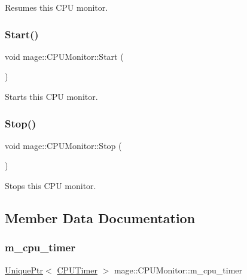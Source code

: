 Resumes this C\+PU monitor. \hypertarget{classmage_1_1_c_p_u_monitor_a3f88acbb979f47309fd46f1b507fed09}{}\label{classmage_1_1_c_p_u_monitor_a3f88acbb979f47309fd46f1b507fed09} 
\subsubsection{\texorpdfstring{Start()}{Start()}}
{\footnotesize\ttfamily void mage\+::\+C\+P\+U\+Monitor\+::\+Start (\begin{DoxyParamCaption}{ }\end{DoxyParamCaption})\hspace{0.3cm}{\ttfamily [noexcept]}}

Starts this C\+PU monitor. \hypertarget{classmage_1_1_c_p_u_monitor_a133aaed1df0e84486a6fc748d66615bb}{}\label{classmage_1_1_c_p_u_monitor_a133aaed1df0e84486a6fc748d66615bb} 
\subsubsection{\texorpdfstring{Stop()}{Stop()}}
{\footnotesize\ttfamily void mage\+::\+C\+P\+U\+Monitor\+::\+Stop (\begin{DoxyParamCaption}{ }\end{DoxyParamCaption})\hspace{0.3cm}{\ttfamily [noexcept]}}

Stops this C\+PU monitor. 

\subsection{Member Data Documentation}
\hypertarget{classmage_1_1_c_p_u_monitor_a925f9d2366d798f2dba783a3ab25f651}{}\label{classmage_1_1_c_p_u_monitor_a925f9d2366d798f2dba783a3ab25f651} 
\subsubsection{\texorpdfstring{m\+\_\+cpu\+\_\+timer}{m\_cpu\_timer}}
{\footnotesize\ttfamily \hyperlink{namespacemage_a8c307fbcc33bce9b7f2aa4c26c3b95cf}{Unique\+Ptr}$<$ \hyperlink{classmage_1_1_c_p_u_timer}{C\+P\+U\+Timer} $>$ mage\+::\+C\+P\+U\+Monitor\+::m\+\_\+cpu\+\_\+timer\hspace{0.3cm}{\ttfamily [private]}}

